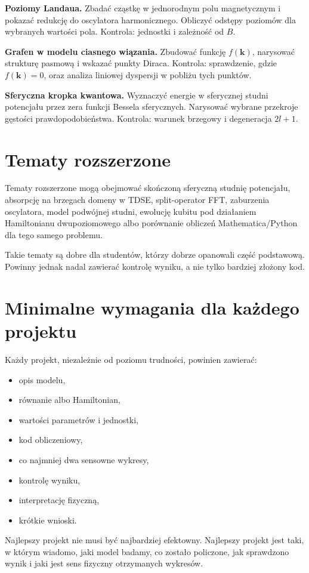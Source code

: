 \begin{exercisebox}
\textbf{Poziomy Landaua.}
Zbadać cząstkę w jednorodnym polu magnetycznym i pokazać redukcję do oscylatora
harmonicznego. Obliczyć odstępy poziomów dla wybranych wartości pola. Kontrola:
jednostki i zależność od \(B\).
\end{exercisebox}

\begin{exercisebox}
\textbf{Grafen w modelu ciasnego wiązania.}
Zbudować funkcję \(f(\mathbf{k})\), narysować strukturę pasmową i wskazać punkty
Diraca. Kontrola: sprawdzenie, gdzie \(f(\mathbf{k})=0\), oraz analiza liniowej
dyspersji w pobliżu tych punktów.
\end{exercisebox}

\begin{exercisebox}
\textbf{Sferyczna kropka kwantowa.}
Wyznaczyć energie w sferycznej studni potencjału przez zera funkcji Bessela
sferycznych. Narysować wybrane przekroje gęstości prawdopodobieństwa. Kontrola:
warunek brzegowy i degeneracja \(2l+1\).
\end{exercisebox}

\section{Tematy rozszerzone}

Tematy rozszerzone mogą obejmować skończoną sferyczną studnię potencjału,
absorpcję na brzegach domeny w TDSE, split-operator FFT, zaburzenia oscylatora,
model podwójnej studni, ewolucję kubitu pod działaniem Hamiltonianu dwupoziomowego
albo porównanie obliczeń Mathematica/Python dla tego samego problemu.

Takie tematy są dobre dla studentów, którzy dobrze opanowali część podstawową.
Powinny jednak nadal zawierać kontrolę wyniku, a nie tylko bardziej złożony kod.

\section{Minimalne wymagania dla każdego projektu}

Każdy projekt, niezależnie od poziomu trudności, powinien zawierać:
\begin{itemize}
    \item opis modelu,
    \item równanie albo Hamiltonian,
    \item wartości parametrów i jednostki,
    \item kod obliczeniowy,
    \item co najmniej dwa sensowne wykresy,
    \item kontrolę wyniku,
    \item interpretację fizyczną,
    \item krótkie wnioski.
\end{itemize}

\begin{summarybox}
Najlepszy projekt nie musi być najbardziej efektowny. Najlepszy projekt jest taki,
w którym wiadomo, jaki model badamy, co zostało policzone, jak sprawdzono wynik i
jaki jest sens fizyczny otrzymanych wykresów.
\end{summarybox}
